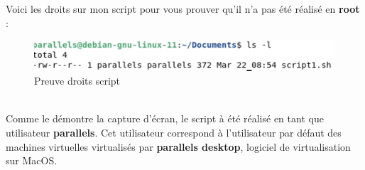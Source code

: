 \documentclass[12pt, a4paper]{article}
\begin{document}
Voici les droits sur mon script pour vous prouver qu'il n'a pas été réalisé en 
\textbf{root} :
\begin{figure}[h]
    \centering
    \includegraphics[width=1\textwidth]{img/preuve1.png}
    \caption{Preuve droits script}
    \label{fig:script2}
\end{figure}\\
Comme le démontre la capture d'écran, le script à été réalisé en tant que utilisateur
\textbf{parallels}. Cet utilisateur correspond à l'utilisateur par défaut des machines
virtuelles virtualisés par \textbf{parallels desktop}, logiciel de virtualisation sur MacOS.

\newpage
\end{document}
